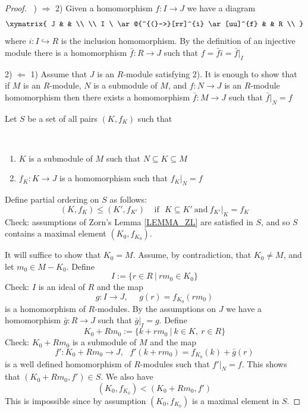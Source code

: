 \documentclass[12pt, letterpaper, oneside]{article}
\theoremstyle{plain}
\theoremstyle{definition}
\newcommand{\hra}{\hookrightarrow}
\newcommand{\benu}{\begin{enumerate}}
\newcommand{\eenu}{\end{enumerate}}
\newcommand{\vs}{\vskip 5mm}
\newcommand{\isep}[1][0]{\setlength{\itemsep}{#1 mm}}
\begin{document}
\begin{proof} \ ) $\Rightarrow$ 2) Given  a homomorphism $f\colon I \to J$ we have a diagram 
 $$
\xymatrix{
J & & \\
\\
I \ \ar@{^{(}->}[rr]^{i} \ar[uu]^{f} & & R   \\
}
$$ 
where $i\colon I \hra R$ is the inclusion homomorphism. By the definition of an injective 
module there is a homomorphism $\bar{f}\colon R \to J$ such that $f = \bar{f}i = \bar{f}|_{I}$


\vs

2) $\Leftarrow$ 1) Assume that $J$ is an $R$-module satisfying 2). It is enough to show that 
if $M$ is an $R$-module, $N$ is a submodule of $M$, and $f\colon N\to J$ is an $R$-module 
homomorphism then there exists a homomorphism $\bar{f}\colon M \to J$ such that 
$\bar{f}|_{N} = f$ 

Let $S$ be a set of all pairs $(K, f_{K})$ such that 

\vskip -13mm

\ 
\benu
\isep[0]
\item[(i)] $K$ is a submodule of $M$ such that $N\subseteq K \subseteq M$
\item[(ii)] $f_{K}\colon K \to J$ is a homomorphism such that $f_{K}|_{N} = f$
\eenu

Define partial ordering on $S$ as follows:
$$(K, f_{K}) \leq (K', f_{K'}) \ \ \ \ \  \text{if} \ \ \ K\subseteq K' \  \text{and} \ f_{K'}|_{K} = f_{K} $$
Check: assumptions of Zorn's Lemma \ref{LEMMA_ZL} are satisfied in $S$, and so $S$ contains 
a maximal element $(K_{0}, f_{K_{0}})$.

\vs

It will suffice to show that $K_{0} = M$. Assume, by contradiction,  
that $K_{0}\neq M$, and let $m_{0}\in M - K_{0}$. Define
$$I := \{r\in R \ | \ rm_{0} \in K_{0} \}$$
Check: $I$ is an ideal of $R$ and the map 
$$g\colon I \to J, \ \ \ \ \ \ g(r) = f_{K_{0}}(rm_{0})$$
is a homomorphism of $R$-modules. By the assumptions on $J$ we have a homomorphism 
$\bar{g}\colon R \to J$  such that $\bar{g}|_{I} = g$. Define
$$K_{0} + Rm_{0} := \{ k+ rm_{0} \ | \ k \in K, \ r\in R\}$$
Check: $K_{0} + Rm_{0}$ is a submodule of $M$ and the map 
$$f'\colon K_{0} + Rm_{0} \to J, \ \ \ f'(k+rm_{0}) = f_{K_{0}}(k) + \bar{g}(r)$$
is a well defined homomorphism of $R$-modules such that $f'|_{N} = f$.
This shows that  $(K_{0} + Rm_{0}, f') \in S$. We also have 
$$(K_{0}, f_{K_{0}}) < (K_{0} + Rm_{0}, f') $$ 
This is impossible since by assumption $(K_{0}, f_{K_{0}})$ is a maximal element in $S$.
\end{proof}
\end{document}
